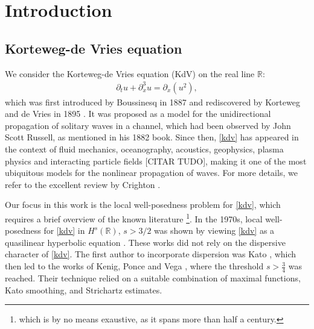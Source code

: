 \documentclass[%
11pt,  reqno]{amsart}
\newcommand{\red}{\color{red}}
\newcommand{\blue}{\color{blue}}
\newcommand{\5}{\textup{V}}
\newcommand{\dx}{\partial_x}
\newcommand{\dt}{\partial_t}
\newcommand{\jp}{\color{red}}
\theoremstyle{remark}
\newcommand{\R}{\mathbb{R}}
\numberwithin{equation}{section}
\numberwithin{theorem}{section}
\begin{document}
		
    \section{Introduction}


    \subsection{Korteweg-de Vries equation}


We consider the Korteweg-de Vries equation (KdV) on the real line $\R$:
	\begin{align}
		\label{kdv}\tag{KdV}
		\dt u + \dx^3 u = \dx(u^2),
	\end{align}
	which was first introduced by Boussinesq in 1887 \cite{Boussinesq} and rediscovered by Korteweg and de Vries in 1895 \cite{KortewegDeVries}. It was proposed as a model for the unidirectional propagation of solitary waves in a channel, which had been observed by John Scott Russell, as mentioned in his 1882 book\cite{Russell}. Since then, \eqref{kdv} has appeared in the context of fluid mechanics, oceanography, acoustics, geophysics, plasma physics and interacting particle fields {\red [CITAR TUDO]}, making it one of the most ubiquitous models for the nonlinear propagation of waves. For more details, we refer to the excellent review by Crighton \cite{Crighton}.
	
	\medskip

Our focus in this work is the local well-posedness problem for \eqref{kdv}, which requires a brief overview of the known literature {\jp \footnote{which is by no means exaustive, as it spans more than half a century.}}. In the 1970s, local well-posedness for \eqref{kdv} in $H^s(\R)$, $s>3/2$ was shown by viewing \eqref{kdv} as a quasilinear hyperbolic equation \cite{BonaSmith, Kato_kdv, SautTemam, TsutsumiMukasa}. These works did not rely on the dispersive character of \eqref{kdv}. The first {\jp author} to incorporate dispersion was Kato \cite{Kato_kdv_disp}, which then led to the works of Kenig, Ponce and Vega \cite{KPV91, KPV_gkdv}, where {\jp the threshold $s>\frac34$ was reached}. Their technique relied on a suitable combination of maximal functions, Kato smoothing, and Strichartz estimates. 
\end{document}
